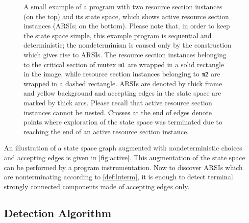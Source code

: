 \begin{figure}[p]
\caption{
    A small example of a program with two resource section instances (on the top) and its state space, which shows active resource section instances (ARSIs; on the bottom).
    Please note that, in order to keep the state space simple, this example program is sequential and deterministic; the nondeterminism is caused only by the construction which gives rise to ARSIs.
    The resource section instances belonging to the critical section of mutex \texttt{m1} are wrapped in a solid rectangle in the image, while resource section instances belonging to \texttt{m2} are wrapped in a dashed rectangle.
    ARSIs are denoted by thick frame and yellow background and accepting edges in the state space are marked by thick arcs.
    Please recall that active resource section instances cannot be nested.
    Crosses at the end of edges denote points where exploration of the state space was terminated due to reaching the end of an active resource section instance.
} \label{fig:active}
\end{figure}

An illustration of a state space graph augmented with nondeterministic choices
and accepting edges is given in \autoref{fig:active}. This augmentation of the state
space can be performed by a program instrumentation.  Now to discover ARSIs which
are nonterminating according to \autoref{def:lnterm}, it is enough to
detect terminal strongly connected components made of accepting edges only.

\subsection{Detection Algorithm}

